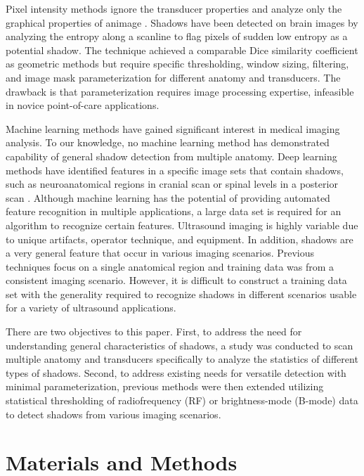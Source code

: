 \documentclass[preprint,5p,authoryear]{elsarticle}
\begin{document}
Pixel intensity methods ignore the transducer properties and analyze only the graphical properties of animage \citep{Hellier2010}. Shadows have been detected on brain images by analyzing the entropy along a scanline to flag pixels of sudden low entropy as a potential shadow. The technique achieved a comparable Dice similarity coefficient as geometric methods but require specific thresholding, window sizing, filtering, and image mask parameterization for different anatomy and transducers. The drawback is that parameterization requires image processing expertise, infeasible in novice point-of-care applications.

Machine learning methods have gained significant interest in medical imaging analysis. To our knowledge, no machine learning method has demonstrated capability of general shadow detection from multiple anatomy. Deep learning methods have identified features in a specific image sets that contain shadows, such as neuroanatomical regions in cranial scan \citep{Milletari2017} or spinal levels in a posterior scan \citep{Hetherington2017}. Although machine learning has the potential of providing automated feature recognition in multiple applications, a large data set is required for an algorithm to recognize certain features. Ultrasound imaging is highly variable due to unique artifacts, operator technique, and equipment. In addition, shadows are a very general feature that occur in various imaging scenarios. Previous techniques focus on a single anatomical region and training data was from a consistent imaging scenario. However, it is difficult to construct a training data set with the generality required to recognize shadows in different scenarios usable for a variety of ultrasound applications.

There are two objectives to this paper. First, to address the need for understanding general characteristics of shadows, a study was conducted to scan multiple anatomy and transducers specifically to analyze the statistics of different types of shadows. Second, to address existing needs for versatile detection with minimal parameterization, previous methods were then extended utilizing statistical thresholding of radiofrequency (RF) or brightness-mode (B-mode) data to detect shadows from various imaging scenarios. 

\section*{Materials and Methods}
\label{MaM}
\end{document}
